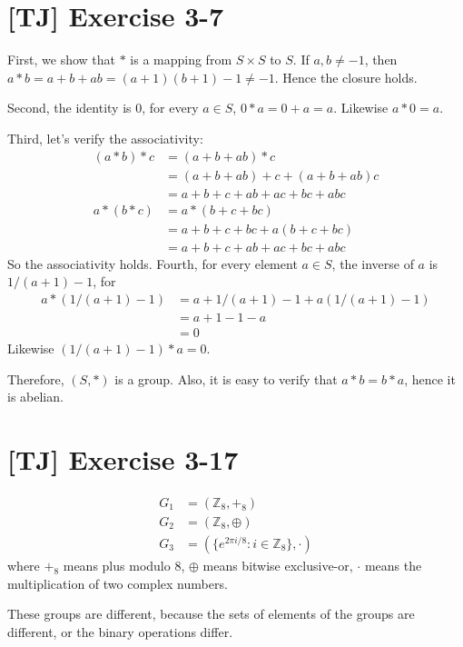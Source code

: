 \documentclass[a4paper,11pt,twocolumn]{article}
\begin{document}
  \section{[TJ] Exercise 3-7}
  First, we show that $*$ is a mapping from $S \times S$ to $S$. If $a, b \neq -1$, then $a*b = a+b+ab = (a+1)(b+1)-1 \neq -1$. Hence the closure holds. \par
  Second, the identity is $0$, for every $a \in S$, $0 * a = 0 + a = a$. Likewise $a * 0 = a$. \par
  Third, let's verify the associativity:
  \begin{align*}
    (a*b)*c &= (a + b + ab)*c \\
     &= (a+b+ab) + c + (a+b+ab)c \\
     &= a + b + c + ab + ac + bc + abc \\
     a*(b*c) &= a*(b+c+bc) \\
     &= a + b + c + bc + a(b+c+bc) \\
     &= a + b + c + ab + ac + bc + abc
  \end{align*}
  So the associativity holds.
  Fourth, for every element $a \in S$, the inverse of $a$ is $1/(a+1) - 1$, for
  \begin{align*}
    a*(1/(a+1) - 1) &= a + 1/(a+1) - 1 + a(1/(a+1) - 1) \\
    &= a + 1 - 1 - a \\
    &= 0
  \end{align*}
  Likewise $(1/(a+1)-1)*a = 0$. \par
  Therefore, $(S, *)$ is a group. Also, it is easy to verify that $a * b = b * a$, hence it is abelian.

  \section{[TJ] Exercise 3-17}
  \begin{align*}
    G_1 &= (\mathbb{Z}_8, +_8) \\
    G_2 &= (\mathbb{Z}_8, \oplus) \\
    G_3 &= (\{e^{2 \pi i / 8} : i \in \mathbb{Z}_8\}, \cdot)
  \end{align*}
  where $+_8$ means plus modulo 8, $\oplus$ means bitwise exclusive-or, $\cdot$ means the multiplication of two complex numbers. \par
  These groups are different, because the sets of elements of the groups are different, or the binary operations differ.
\end{document}
